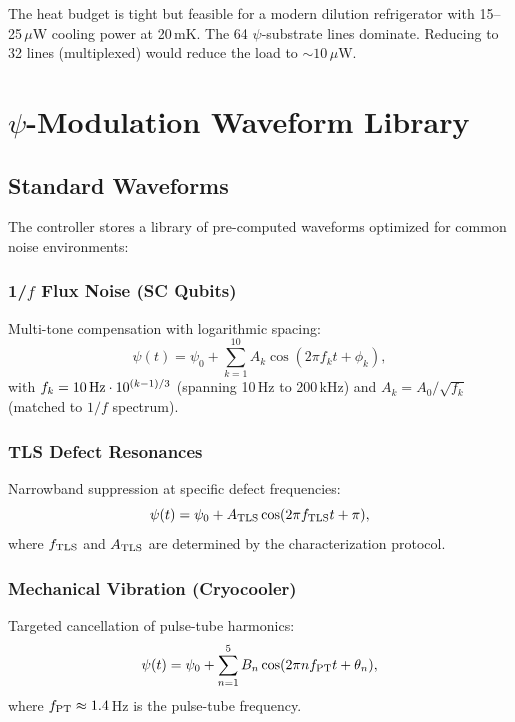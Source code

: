 \documentclass[11pt,letterpaper]{article}
\begin{document}
The heat budget is tight but feasible for a modern dilution refrigerator
with 15--25\,$\mu$W cooling power at 20\,mK. The 64 $\psi$-substrate
lines dominate. Reducing to 32 lines (multiplexed) would reduce the load
to $\sim 10\,\mu$W.

\section{$\psi$-Modulation Waveform Library}

\subsection{Standard Waveforms}

The controller stores a library of pre-computed waveforms optimized for
common noise environments:

\subsubsection{1/$f$ Flux Noise (SC Qubits)}

Multi-tone compensation with logarithmic spacing:
\begin{equation}
\psi(t) = \psi_0 + \sum_{k=1}^{10} A_k \cos(2\pi f_k t + \phi_k),
\end{equation}
with $f_k = 10\,{\rm Hz} \cdot 10^{(k-1)/3}$ (spanning 10\,Hz to
200\,kHz) and $A_k = A_0/\sqrt{f_k}$ (matched to $1/f$ spectrum).

\subsubsection{TLS Defect Resonances}

Narrowband suppression at specific defect frequencies:
\begin{equation}
\psi(t) = \psi_0 + A_{\rm TLS}\cos(2\pi f_{\rm TLS} t + \pi),
\end{equation}
where $f_{\rm TLS}$ and $A_{\rm TLS}$ are determined by the
characterization protocol.

\subsubsection{Mechanical Vibration (Cryocooler)}

Targeted cancellation of pulse-tube harmonics:
\begin{equation}
\psi(t) = \psi_0 + \sum_{n=1}^{5} B_n \cos(2\pi n f_{\rm PT} t + \theta_n),
\end{equation}
where $f_{\rm PT} \approx 1.4$\,Hz is the pulse-tube frequency.
\end{document}
